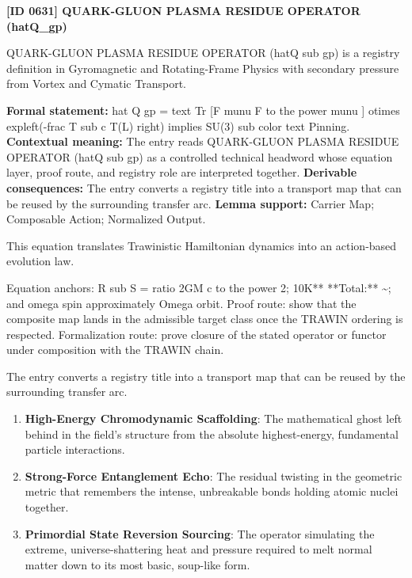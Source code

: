 \clearpage
\noindent\textbf{[ID 0631] QUARK-GLUON PLASMA RESIDUE OPERATOR (hatQ\_gp)}\par
\vspace{0.35em}
\begingroup\small
{}
QUARK-GLUON PLASMA RESIDUE OPERATOR (hatQ sub gp) is a registry definition in Gyromagnetic and Rotating-Frame Physics with secondary pressure from Vortex and Cymatic Transport.

\begingroup\footnotesize\setlength{\emergencystretch}{3em}\sloppy
\textbf{Formal statement:} hat Q gp = text Tr [F munu F to the power munu ] otimes expleft(-frac T sub c T(L) right) implies SU(3) sub color text Pinning. \textbf{Contextual meaning:} The entry reads QUARK-GLUON PLASMA RESIDUE OPERATOR (hatQ sub gp) as a controlled technical headword whose equation layer, proof route, and registry role are interpreted together. \textbf{Derivable consequences:} The entry converts a registry title into a transport map that can be reused by the surrounding transfer arc. \textbf{Lemma support:} Carrier Map; Composable Action; Normalized Output.\par
\endgroup

This equation translates Trawinistic Hamiltonian dynamics into an action-based evolution law.

Equation anchors: R sub S = ratio 2GM c to the power 2; 10K** **Total:** \textasciitilde{}; and omega spin approximately Omega orbit. Proof route: show that the composite map lands in the admissible target class once the TRAWIN ordering is respected. Formalization route: prove closure of the stated operator or functor under composition with the TRAWIN chain.

The entry converts a registry title into a transport map that can be reused by the surrounding transfer arc.
\endgroup

\begin{enumerate}[leftmargin=1.6em,itemsep=6pt,topsep=4pt]
\item \textbf{High-Energy Chromodynamic Scaffolding}: The mathematical ghost left behind in the field's structure from the absolute highest-energy, fundamental particle interactions.
\item \textbf{Strong-Force Entanglement Echo}: The residual twisting in the geometric metric that remembers the intense, unbreakable bonds holding atomic nuclei together.
\item \textbf{Primordial State Reversion Sourcing}: The operator simulating the extreme, universe-shattering heat and pressure required to melt normal matter down to its most basic, soup-like form.
\end{enumerate}

